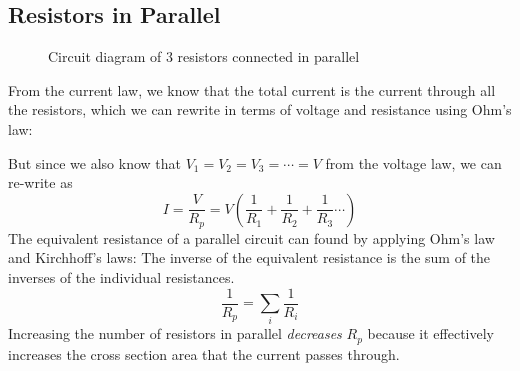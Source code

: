 \subsection{Resistors in Parallel}

\begin{figure}[ht]
  \centering
  \caption{Circuit diagram of 3 resistors connected in parallel}
\end{figure}
From the current law, we know that the total current is the current through all
the resistors, which we can rewrite in terms of voltage and resistance using
Ohm's law:
%
    
But since we also know that $V_1=V_2=V_3=\cdots=V$ from the voltage law, we
can re-write as
\begin{equation*}
  I=\frac V{R_p}=V\left(\frac1{R_1}+\frac1{R_2}+\frac1{R_3}\cdots\right)
\end{equation*}
The equivalent resistance of a parallel circuit can found by applying Ohm's law
and Kirchhoff's laws: The inverse of the equivalent resistance is the sum of
the inverses of the individual resistances.
\begin{equation}
  \boxed{
    \frac1{R_p}=\sum_i\frac1{R_i}
  }
\end{equation}
Increasing the number of resistors in parallel \emph{decreases} $R_p$ because
it effectively increases the cross section area that the current passes through.

